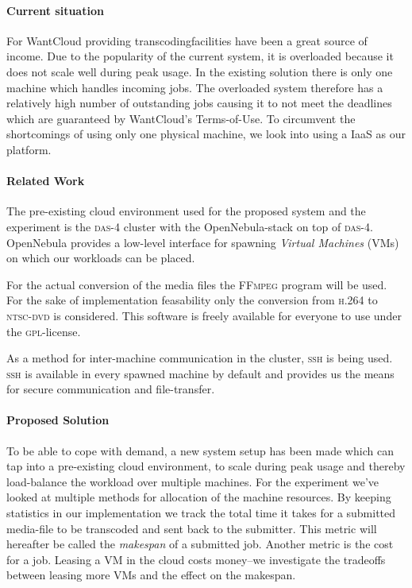 \paragraph{Current situation}
For WantCloud providing transcoding\footnotemark facilities have been
a great source of income. Due to the popularity of the current system,
it is overloaded because it does not scale well during peak usage. In
the existing solution there is only one machine which handles incoming
jobs. The overloaded system therefore has a relatively high number of
outstanding jobs causing it to not meet the deadlines which are
guaranteed by WantCloud's Terms-of-Use. To circumvent the shortcomings
of using only one physical machine, we look into using a IaaS as our
platform.

\paragraph{Related Work}
The pre-existing cloud environment used for the proposed system and
the experiment is the \textsc{das-4}\cite{URL:DAS4} cluster with the
OpenNebula-stack\cite{URL:OpenNebula} on top
of \textsc{das-4}. OpenNebula provides a low-level interface for
spawning \emph{Virtual Machines} (VMs) on which our workloads can be
placed.

For the actual conversion of the media files the
\textsc{FFmpeg}\cite{URL:FFmpeg} program
will be used. For the sake of implementation feasability only the
conversion from \textsc{h.264}\cite{Standard:H264} to \textsc{ntsc-dvd}
is considered. This software is freely available for everyone to use
under the \textsc{gpl}-license.

As a method for inter-machine communication in the cluster,
\textsc{ssh} is being used. \textsc{ssh} is available in every spawned
machine by default and provides us the means for secure communication
and file-transfer.

\paragraph{Proposed Solution}
To be able to cope with demand, a new system setup has been made which
can tap into a pre-existing cloud environment, to scale during peak
usage and thereby load-balance the workload over multiple
machines. For the experiment we've looked at multiple methods for
allocation of the machine resources. By keeping statistics in our
implementation we track the total time it takes for a submitted
media-file to be transcoded and sent back to the submitter. This
metric will hereafter be called the \emph{makespan} of a submitted
job. Another metric is the cost for a job. Leasing a VM in the cloud
costs money--we investigate the tradeoffs between leasing more VMs
and the effect on the makespan.

